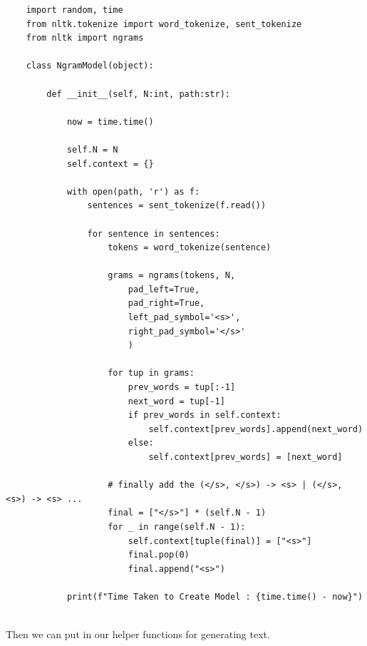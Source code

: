 \documentclass{article}
\begin{document}
    \begin{lstlisting}
    import random, time
    from nltk.tokenize import word_tokenize, sent_tokenize
    from nltk import ngrams

    class NgramModel(object): 
        
        def __init__(self, N:int, path:str): 
            
            now = time.time()
            
            self.N = N 
            self.context = {}
            
            with open(path, 'r') as f:
                sentences = sent_tokenize(f.read()) 
                
                for sentence in sentences: 
                    tokens = word_tokenize(sentence)
                
                    grams = ngrams(tokens, N, 
                        pad_left=True, 
                        pad_right=True, 
                        left_pad_symbol='<s>', 
                        right_pad_symbol='</s>'
                        )
                    
                    for tup in grams: 
                        prev_words = tup[:-1] 
                        next_word = tup[-1]
                        if prev_words in self.context: 
                            self.context[prev_words].append(next_word)
                        else: 
                            self.context[prev_words] = [next_word]
                            
                    # finally add the (</s>, </s>) -> <s> | (</s>, <s>) -> <s> ...
                    final = ["</s>"] * (self.N - 1) 
                    for _ in range(self.N - 1): 
                        self.context[tuple(final)] = ["<s>"]
                        final.pop(0) 
                        final.append("<s>")
                            
            print(f"Time Taken to Create Model : {time.time() - now}")
                    
    \end{lstlisting}
    Then we can put in our helper functions for generating text. 
\end{document}
